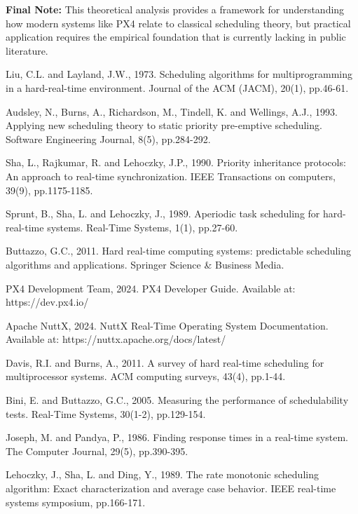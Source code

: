 \documentclass[12pt,a4paper]{article}
\begin{document}
\textbf{Final Note:} This theoretical analysis provides a framework for understanding how modern systems like PX4 relate to classical scheduling theory, but practical application requires the empirical foundation that is currently lacking in public literature.

\begin{thebibliography}{15}
Liu, C.L. and Layland, J.W., 1973. Scheduling algorithms for multiprogramming in a hard-real-time environment. Journal of the ACM (JACM), 20(1), pp.46-61.

Audsley, N., Burns, A., Richardson, M., Tindell, K. and Wellings, A.J., 1993. Applying new scheduling theory to static priority pre-emptive scheduling. Software Engineering Journal, 8(5), pp.284-292.

Sha, L., Rajkumar, R. and Lehoczky, J.P., 1990. Priority inheritance protocols: An approach to real-time synchronization. IEEE Transactions on computers, 39(9), pp.1175-1185.

Sprunt, B., Sha, L. and Lehoczky, J., 1989. Aperiodic task scheduling for hard-real-time systems. Real-Time Systems, 1(1), pp.27-60.

Buttazzo, G.C., 2011. Hard real-time computing systems: predictable scheduling algorithms and applications. Springer Science \& Business Media.

PX4 Development Team, 2024. PX4 Developer Guide. Available at: https://dev.px4.io/

Apache NuttX, 2024. NuttX Real-Time Operating System Documentation. Available at: https://nuttx.apache.org/docs/latest/

Davis, R.I. and Burns, A., 2011. A survey of hard real-time scheduling for multiprocessor systems. ACM computing surveys, 43(4), pp.1-44.

Bini, E. and Buttazzo, G.C., 2005. Measuring the performance of schedulability tests. Real-Time Systems, 30(1-2), pp.129-154.

Joseph, M. and Pandya, P., 1986. Finding response times in a real-time system. The Computer Journal, 29(5), pp.390-395.

Lehoczky, J., Sha, L. and Ding, Y., 1989. The rate monotonic scheduling algorithm: Exact characterization and average case behavior. IEEE real-time systems symposium, pp.166-171.


\end{thebibliography}
\end{document}
